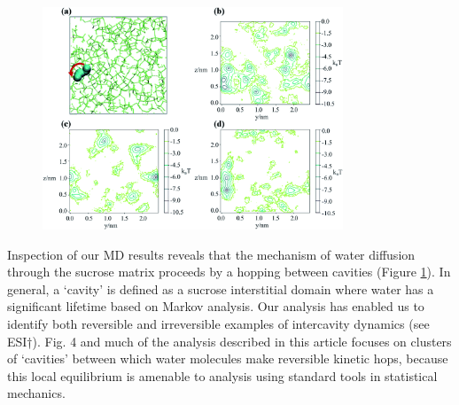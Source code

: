 \begin{figure}
    \centering
    \includegraphics[width=0.8\textwidth]{chapters/water_hopping/figures/f3.png}
    \label{fig:wat_sucrose_matrix}
\end{figure}

Inspection of our MD results reveals that the mechanism of water diffusion through the sucrose matrix proceeds by a hopping between cavities (Figure \ref{fig:wat_sucrose_matrix}). In general, a `cavity’ is defined as a sucrose interstitial domain where water has a significant lifetime based on Markov analysis. Our analysis has enabled us to identify both reversible and irreversible examples of intercavity dynamics (see ESI†). Fig. 4 and much of the analysis described in this article focuses on clusters of `cavities’ between which water molecules make reversible kinetic hops, because this local equilibrium is amenable to analysis using standard tools in statistical mechanics.

